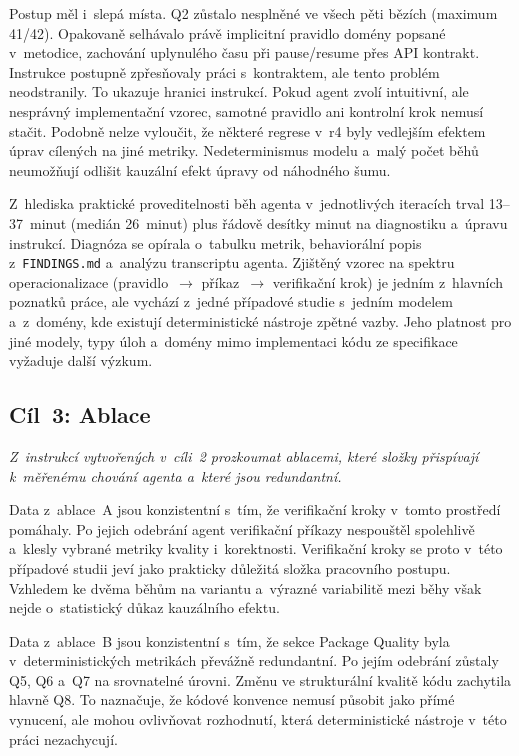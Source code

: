 \FloatBarrier

Postup měl i~slepá místa. \acs{Q2} zůstalo nesplněné ve všech pěti
bězích (maximum 41/42). Opakovaně selhávalo právě implicitní pravidlo
domény popsané v~metodice, zachování uplynulého času při pause/resume
přes API kontrakt. Instrukce postupně zpřesňovaly práci s~kontraktem,
ale tento problém neodstranily. To ukazuje hranici instrukcí. Pokud
agent zvolí intuitivní, ale nesprávný implementační vzorec, samotné
pravidlo ani kontrolní krok nemusí stačit. Podobně nelze vyloučit, že
některé regrese v~r4 byly vedlejším efektem úprav cílených na jiné
metriky. Nedeterminismus modelu a~malý počet běhů neumožňují odlišit
kauzální efekt úpravy od náhodného šumu.

Z~hlediska praktické proveditelnosti běh agenta v~jednotlivých
iteracích trval 13--37~minut (medián 26~minut) plus řádově desítky
minut na diagnostiku a~úpravu instrukcí. Diagnóza se opírala o~tabulku metrik,
behaviorální popis z~\texttt{FINDINGS.md} a~analýzu transcriptu
agenta. Zjištěný vzorec na spektru operacionalizace
(pravidlo~$\to$ příkaz~$\to$ verifikační krok) je jedním
z~hlavních poznatků práce, ale vychází z~jedné případové
studie s~jedním modelem a~z~domény, kde existují deterministické
nástroje zpětné vazby. Jeho platnost pro jiné modely, typy úloh
a~domény mimo implementaci kódu ze specifikace vyžaduje další výzkum.

\subsection{Cíl~3: Ablace}
\label{sec:vyhodnoceni-cil3}

\textit{Z~instrukcí vytvořených v~cíli~2 prozkoumat ablacemi, které
složky přispívají k~měřenému chování agenta a~které jsou
redundantní.}

Data z~ablace~A jsou konzistentní s~tím, že verifikační kroky
v~tomto prostředí pomáhaly. Po jejich odebrání agent verifikační
příkazy nespouštěl spolehlivě a~klesly vybrané metriky kvality
i~korektnosti. Verifikační kroky se proto v~této případové studii
jeví jako prakticky důležitá složka pracovního postupu. Vzhledem
ke dvěma běhům na variantu a~výrazné variabilitě mezi běhy však nejde
o~statistický důkaz kauzálního efektu.

Data z~ablace~B jsou konzistentní s~tím, že sekce Package Quality
byla v~deterministických metrikách převážně redundantní. Po jejím
odebrání zůstaly \acs{Q5}, \acs{Q6} a~\acs{Q7} na srovnatelné úrovni.
Změnu ve strukturální kvalitě kódu zachytila hlavně \acs{Q8}. To
naznačuje, že kódové konvence nemusí působit jako přímé vynucení, ale
mohou ovlivňovat rozhodnutí, která deterministické nástroje v~této
práci nezachycují.

